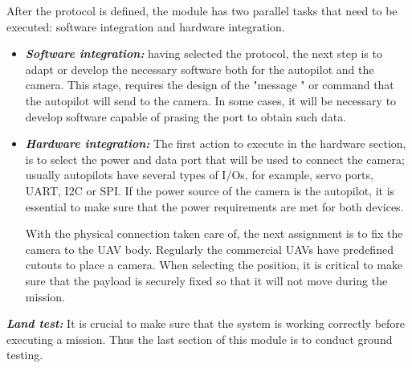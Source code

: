 After the protocol is defined, the module has two parallel tasks that need to be executed: software integration and hardware integration.
\begin{itemize}
    \item \textbf{\textit{Software integration:}} having selected the protocol, the next step is to adapt or develop the necessary software both for the autopilot and the camera. This stage, requires the design of the "message " or command that the autopilot will send to the camera. In some cases, it will be necessary to develop software capable of prasing the port to obtain such data.
     \item \textbf{\textit{Hardware integration:}} The first action to execute in the hardware section, is to select the power and data port that will be used to connect the camera; usually autopilots have several types of I/Os, for example, servo ports, UART, I2C or SPI. If the power source of the camera is the autopilot, it is essential to make sure that the power requirements are met for both devices.
     
With the physical connection taken care of, the next assignment is to fix the camera to the UAV body. Regularly the commercial UAVs have predefined cutouts to place a camera. When selecting the position, it is critical to make sure that the payload is securely fixed so that it will not move during the mission.
     
\end{itemize}
\textit{\textbf{Land test:}} It is crucial to make sure that the system is working correctly before executing a mission. Thus the last section of this module is to conduct ground testing.

